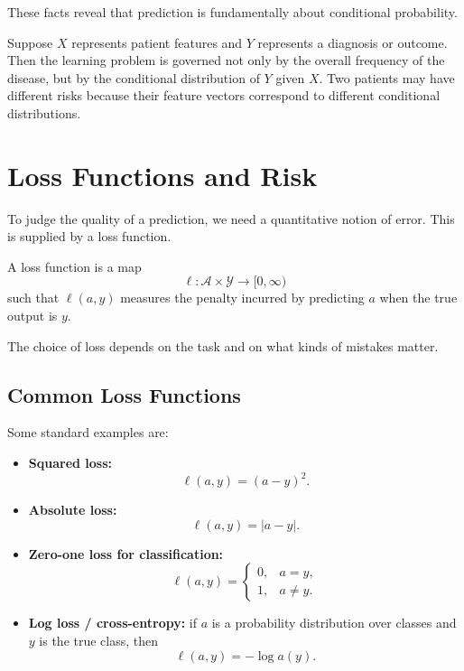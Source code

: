 These facts reveal that prediction is fundamentally about conditional probability.

\begin{example}
Suppose $X$ represents patient features and $Y$ represents a diagnosis or outcome. Then the learning problem is governed not only by the overall frequency of the disease, but by the conditional distribution of $Y$ given $X$. Two patients may have different risks because their feature vectors correspond to different conditional distributions.
\end{example}

\section{Loss Functions and Risk}

To judge the quality of a prediction, we need a quantitative notion of error. This is supplied by a loss function.

\begin{definition}
A loss function is a map
\[
\ell:\mathcal{A}\times\mathcal{Y}\to[0,\infty)
\]
such that $\ell(a,y)$ measures the penalty incurred by predicting $a$ when the true output is $y$.
\end{definition}

The choice of loss depends on the task and on what kinds of mistakes matter.

\subsection{Common Loss Functions}

Some standard examples are:
\begin{itemize}
    \item \textbf{Squared loss:}
    \[
    \ell(a,y) = (a-y)^2.
    \]
    \item \textbf{Absolute loss:}
    \[
    \ell(a,y) = |a-y|.
    \]
    \item \textbf{Zero-one loss for classification:}
    \[
    \ell(a,y)=
    \begin{cases}
        0, & a=y,\\
        1, & a\neq y.
    \end{cases}
    \]
    \item \textbf{Log loss / cross-entropy:} if $a$ is a probability distribution over classes and $y$ is the true class, then
    \[
    \ell(a,y) = -\log a(y).
    \]
\end{itemize}

